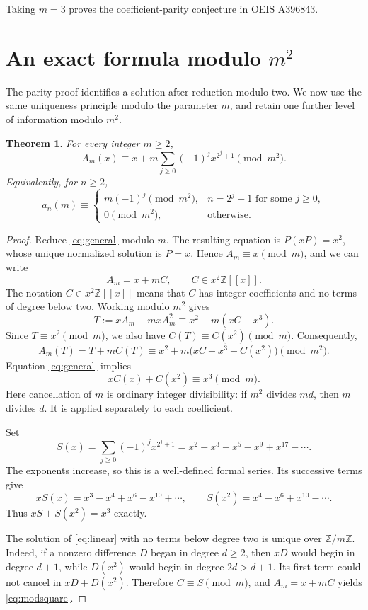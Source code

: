 \documentclass[11pt,a4paper]{article}
\newtheorem{theorem}{Theorem}[section]
\theoremstyle{remark}
\newcommand{\Z}{\mathbb Z}
\begin{document}
Taking $m=3$ proves the coefficient-parity conjecture in OEIS A396843.

\section{An exact formula modulo \texorpdfstring{$m^2$}{m squared}}

The parity proof identifies a solution after reduction modulo two. We now
use the same uniqueness principle modulo the parameter $m$, and retain
one further level of information modulo $m^2$.

\begin{theorem}\label{thm:modsquare}
For every integer $m\ge2$,
\begin{equation}\label{eq:modsquare}
 A_m(x)\equiv x+m\sum_{j\ge0}(-1)^jx^{2^j+1}\pmod{m^2}.
\end{equation}
Equivalently, for $n\ge2$,
\begin{equation}\label{eq:coeffmod}
 a_n(m)\equiv
 \begin{cases}
   m(-1)^j\pmod{m^2},&n=2^j+1\text{ for some }j\ge0,\\
   0\pmod{m^2},&\text{otherwise}.
 \end{cases}
\end{equation}
\end{theorem}

\begin{proof}
Reduce \eqref{eq:general} modulo $m$. The resulting equation is
$P(xP)=x^2$, whose unique normalized solution is $P=x$.
Hence $A_m\equiv x\pmod m$, and we can write
\[
 A_m=x+mC,\qquad C\in x^2\Z[[x]].
\]
The notation $C\in x^2\Z[[x]]$ means that $C$ has integer coefficients
and no terms of degree below two. Working modulo $m^2$ gives
\[
 T:=xA_m-mxA_m^2
 \equiv x^2+m(xC-x^3).
\]
Since $T\equiv x^2\pmod m$, we also have
$C(T)\equiv C(x^2)\pmod m$. Consequently,
\[
 A_m(T)=T+mC(T)
 \equiv x^2+m\bigl(xC-x^3+C(x^2)\bigr)\pmod{m^2}.
\]
Equation \eqref{eq:general} implies
\begin{equation}\label{eq:linear}
 xC(x)+C(x^2)\equiv x^3\pmod m.
\end{equation}
Here cancellation of $m$ is ordinary integer divisibility: if $m^2$ divides
$md$, then $m$ divides $d$. It is applied separately to each coefficient.

Set
\[
 S(x)=\sum_{j\ge0}(-1)^jx^{2^j+1}
 =x^2-x^3+x^5-x^9+x^{17}-\cdots.
\]
The exponents increase, so this is a well-defined formal series. Its
successive terms give
\[
 xS(x)=x^3-x^4+x^6-x^{10}+\cdots,\qquad
 S(x^2)=x^4-x^6+x^{10}-\cdots.
\]
Thus $xS+S(x^2)=x^3$ exactly.

The solution of \eqref{eq:linear} with no terms below degree two is unique
over $\Z/m\Z$. Indeed, if a nonzero difference $D$ began in degree
$d\ge2$, then $xD$ would begin in degree $d+1$, while $D(x^2)$ would
begin in degree $2d>d+1$. Its first term could not cancel in
$xD+D(x^2)$. Therefore $C\equiv S\pmod m$, and
$A_m=x+mC$ yields \eqref{eq:modsquare}.
\end{proof}
\end{document}
